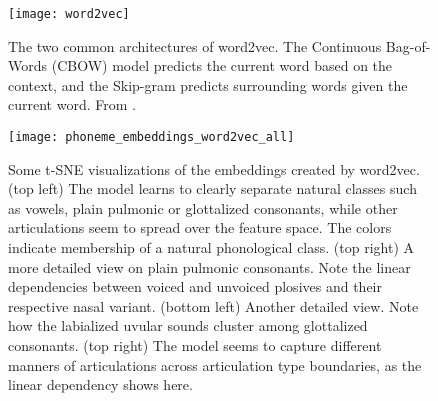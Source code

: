 \documentclass[6pt]{article}
\begin{document}
\begin{figure}[h!] %
\begin{center}
   \texttt{[image: word2vec]} 
   \caption{The two common architectures of word2vec. The Continuous Bag-of-Words (CBOW) model predicts the current word based on the
context, and the Skip-gram predicts surrounding words given the current word. From \cite{mikolov2013efficient}.}
   \label{fig:word2vec}
   \end{center}

\end{figure}

%

\begin{figure}[h!] %
   \centering
   \texttt{[image: phoneme\_embeddings\_word2vec\_all]} 
   \caption{Some t-SNE visualizations of the embeddings created by word2vec. (top left) The model learns to clearly separate natural classes such as vowels, plain pulmonic or glottalized consonants, while other articulations seem to spread over the feature space. The colors indicate membership of a natural phonological class.  (top right) A more detailed view on plain pulmonic consonants. Note the linear dependencies between voiced and unvoiced plosives and their respective nasal variant. (bottom left) Another detailed view. Note how the labialized uvular sounds cluster among glottalized consonants. (top right) The model seems to capture different manners of articulations across articulation type boundaries, as the linear dependency shows here.}
   \label{fig:phoneme_embeddings_word2vec_all}
\end{figure}
\end{document}
